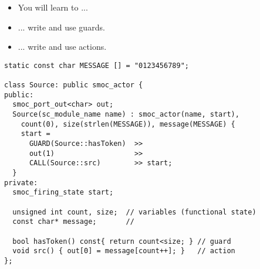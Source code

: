 \begin{frame}
\begin{itemize}
\item You will learn to ...
\item ... write and use guards.
\item ... write and use actions.
\end{itemize}
\end{frame}




\begin{frame}[fragile=singleslide]
\begin{lstlisting}
static const char MESSAGE [] = "0123456789";

class Source: public smoc_actor {
public:
  smoc_port_out<char> out;
  Source(sc_module_name name) : smoc_actor(name, start),
    count(0), size(strlen(MESSAGE)), message(MESSAGE) {
    start = 
      GUARD(Source::hasToken)  >>
      out(1)                   >>
      CALL(Source::src)        >> start;
  }
private:
  smoc_firing_state start;

  unsigned int count, size;  // variables (functional state)
  const char* message;       //

  bool hasToken() const{ return count<size; } // guard
  void src() { out[0] = message[count++]; }   // action
};

\end{lstlisting}
\end{frame}






